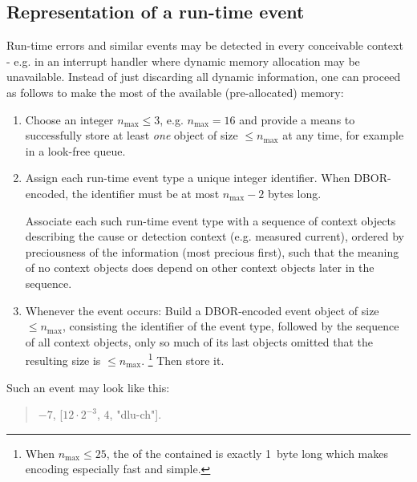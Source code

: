 \subsection{Representation of a run-time event}

Run-time errors and similar events may be detected in every conceivable context -
e.g. in an interrupt handler where dynamic memory allocation may be unavailable.
Instead of just discarding all dynamic information, one can proceed as follows to make the most of the available
(pre-allocated) memory:

\begin{enumerate}
    \item
    Choose an integer $n_{\text{max}} \le 3$, e.g. $n_{\text{max}} = 16$ and provide a means to successfully store at
    least \emph{one} object of size $\le n_{\text{max}}$ at any time, for example in a look-free queue.

    \item
    Assign each run-time event type a unique integer identifier.
    When DBOR-encoded, the identifier must be at most $n_{\text{max}} - 2$ bytes long.

    Associate each such run-time event type with a sequence of context objects describing the cause or detection context
    (e.g. measured current), ordered by preciousness of the information (most precious first), such that the meaning
    of no context objects does depend on other context objects later in the sequence.

    \item
    Whenever the event occurs:
    Build a DBOR-encoded event object of size $\le n_{\text{max}}$, consisting the
    identifier of the event type, followed by the sequence of all context objects, only so much of its last objects
    omitted that the resulting size is $\le n_{\text{max}}$.%
    \footnote{%
        When $n_{\text{max}} \le 25$, the \DborIntegerToken{} of the contained \DborSequenceValue{}
        is exactly 1~byte long which makes encoding especially fast and simple.
    }
    Then store it.
\end{enumerate}

\begin{BeginParPenalty}
    Such an event may look like this:
    \begin{quote}
        $-7$, [$12 \cdot 2^{-3}$, $4$, "dlu-ch"].
    \end{quote}
\end{BeginParPenalty}

